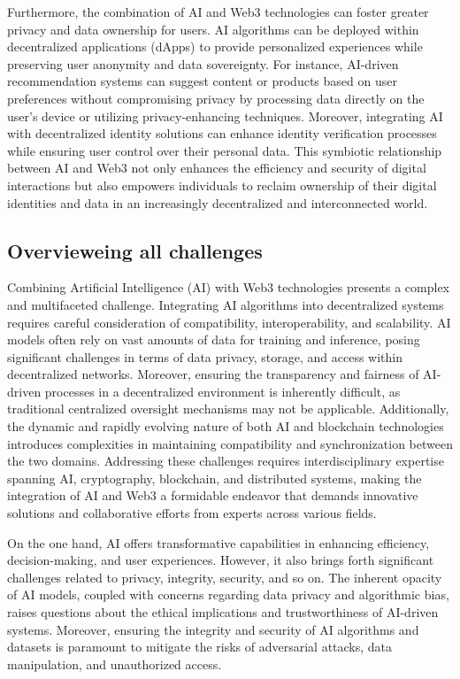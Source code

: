 \documentclass[conference]{IEEEtran}
\begin{document}
Furthermore, the combination of AI and Web3 technologies can foster greater privacy and data ownership for users. AI algorithms can be deployed within decentralized applications (dApps) to provide personalized experiences while preserving user anonymity and data sovereignty. For instance, AI-driven recommendation systems can suggest content or products based on user preferences without compromising privacy by processing data directly on the user's device or utilizing privacy-enhancing techniques. Moreover, integrating AI with decentralized identity solutions can enhance identity verification processes while ensuring user control over their personal data. This symbiotic relationship between AI and Web3 not only enhances the efficiency and security of digital interactions but also empowers individuals to reclaim ownership of their digital identities and data in an increasingly decentralized and interconnected world.

\subsection{Overvieweing all challenges}

Combining Artificial Intelligence (AI) with Web3 technologies presents a complex and multifaceted challenge. Integrating AI algorithms into decentralized systems requires careful consideration of compatibility, interoperability, and scalability. AI models often rely on vast amounts of data for training and inference, posing significant challenges in terms of data privacy, storage, and access within decentralized networks. Moreover, ensuring the transparency and fairness of AI-driven processes in a decentralized environment is inherently difficult, as traditional centralized oversight mechanisms may not be applicable. Additionally, the dynamic and rapidly evolving nature of both AI and blockchain technologies introduces complexities in maintaining compatibility and synchronization between the two domains. Addressing these challenges requires interdisciplinary expertise spanning AI, cryptography, blockchain, and distributed systems, making the integration of AI and Web3 a formidable endeavor that demands innovative solutions and collaborative efforts from experts across various fields.

On the one hand, AI offers transformative capabilities in enhancing efficiency, decision-making, and user experiences. However, it also brings forth significant challenges related to privacy, integrity, security, and so on. The inherent opacity of AI models, coupled with concerns regarding data privacy and algorithmic bias, raises questions about the ethical implications and trustworthiness of AI-driven systems. Moreover, ensuring the integrity and security of AI algorithms and datasets is paramount to mitigate the risks of adversarial attacks, data manipulation, and unauthorized access.
\end{document}
